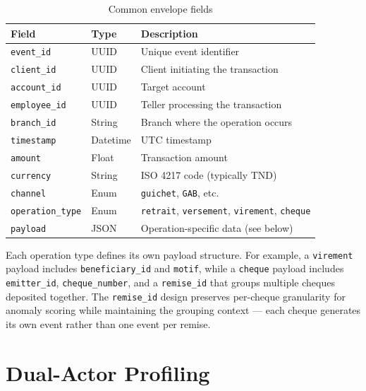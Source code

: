 \begin{table}[H]
\centering
\caption{Common envelope fields}
\label{tab:raw-event-envelope}
\begin{tabular}{@{}lll@{}}
\toprule
\textbf{Field} & \textbf{Type} & \textbf{Description} \\
\midrule
\texttt{event\_id}       & UUID     & Unique event identifier \\
\texttt{client\_id}      & UUID     & Client initiating the transaction \\
\texttt{account\_id}     & UUID     & Target account \\
\texttt{employee\_id}    & UUID     & Teller processing the transaction \\
\texttt{branch\_id}      & String   & Branch where the operation occurs \\
\texttt{timestamp}       & Datetime & UTC timestamp \\
\texttt{amount}          & Float    & Transaction amount \\
\texttt{currency}        & String   & ISO 4217 code (typically TND) \\
\texttt{channel}         & Enum     & \texttt{guichet}, \texttt{GAB}, etc. \\
\texttt{operation\_type} & Enum     & \texttt{retrait}, \texttt{versement}, \texttt{virement}, \texttt{cheque} \\
\texttt{payload}         & JSON     & Operation-specific data (see below) \\
\bottomrule
\end{tabular}
\end{table}

Each operation type defines its own payload structure. For example, a \texttt{virement}
payload includes \texttt{beneficiary\_id} and \texttt{motif}, while a
\texttt{cheque} payload includes \texttt{emitter\_id}, \texttt{cheque\_number}, and
a \texttt{remise\_id} that groups multiple cheques deposited together. The
\texttt{remise\_id} design preserves per-cheque granularity for anomaly scoring while
maintaining the grouping context --- each cheque generates its own event rather than
one event per remise.

\section{Dual-Actor Profiling}

